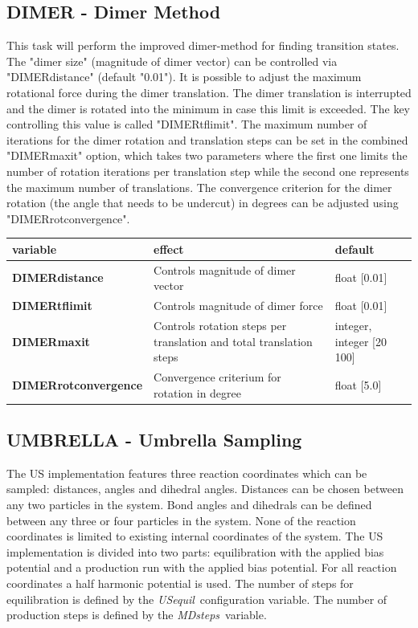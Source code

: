 \documentclass[10pt,a4paper]{article} %
\begin{document}
	\subsection{DIMER - Dimer Method}
	This task will perform the improved dimer-method for finding transition states\supercite{dimermethod}. The "dimer size" (magnitude of dimer vector) can be controlled via "DIMERdistance" (default "0.01").
	It is possible to adjust the maximum rotational force during the dimer translation. The dimer translation is interrupted and the dimer is rotated into the minimum in case this limit is exceeded. The key controlling this value is called "DIMERtflimit".
	The maximum number of iterations for the dimer rotation and translation steps can be set in the combined "DIMERmaxit" option, which takes two parameters where the first one limits the number of rotation iterations per translation step while the second one represents the maximum number of translations.
	The convergence criterion for the dimer rotation (the angle that needs to be undercut) in degrees can be adjusted using "DIMERrotconvergence".
		
	\begin{tabularx}{\textwidth}{l|X|X}
		variable & effect & default \\
		\hline
		\textbf{DIMERdistance} & Controls magnitude of dimer vector & float [0.01] \\
		\textbf{DIMERtflimit} & Controls magnitude of dimer force & float [0.01] \\
		\textbf{DIMERmaxit}& Controls rotation steps per translation and total translation steps & integer, integer [20 100]\\
		\textbf{DIMERrotconvergence} & Convergence criterium for rotation in degree & float [5.0] \\
	\end{tabularx}
	
	\subsection{UMBRELLA - Umbrella Sampling}
	The \acf{US}\supercite{umbrellasampling1, umbrellasampling2, umbrellasamplingreview} implementation features three reaction coordinates which can be sampled: distances, angles and dihedral angles. Distances can be chosen between any two particles in the system. Bond angles and dihedrals can be defined between any three or four particles in the system. None of the reaction coordinates is limited to existing internal coordinates of the system.
	The \acl{US} implementation is divided into two parts: equilibration with the applied bias potential and a production run with the applied bias potential. For all reaction coordinates a half harmonic potential is used. The number of steps for equilibration is defined by the \glqq\textit{USequil}\grqq~configuration variable. The number of production steps is defined by the \glqq\textit{MDsteps}\grqq~variable.
\end{document}
